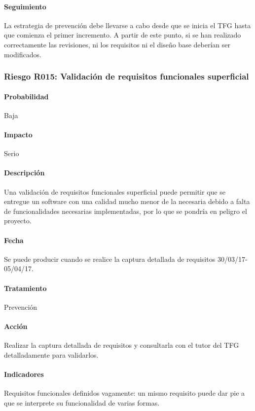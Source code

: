 \documentclass[10pt,a4paper]{article}
\begin{document}
				\paragraph{Seguimiento}	La estrategia de prevención debe llevarse a cabo desde que se inicia el TFG hasta que comienza el primer incremento. A partir de este punto, si se han realizado correctamente las revisiones, ni los requisitos ni el diseño base deberían ser modificados. 

			\subsubsection{Riesgo R015: Validación de requisitos funcionales superficial}
				\paragraph{Probabilidad} Baja
				\paragraph{Impacto}	Serio
				\paragraph{Descripción} Una validación de requisitos funcionales superficial puede permitir que se entregue un software con una calidad mucho menor de la necesaria debido a falta de funcionalidades necesarias implementadas, por lo que se pondría en peligro el proyecto. 
				\paragraph{Fecha} Se puede producir cuando se realice la captura detallada de requisitos 30/03/17-05/04/17. %
				\paragraph{Tratamiento} Prevención %
				\paragraph{Acción} Realizar la captura detallada de requisitos y consultarla con el tutor del TFG detalladamente para validarlos. %
				\paragraph{Indicadores} Requisitos funcionales definidos vagamente: un mismo requisito puede dar pie a que se interprete su funcionalidad de varias formas. %
\end{document}
